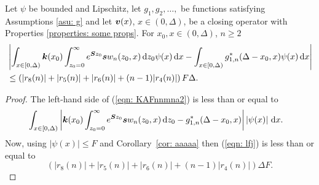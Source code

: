 \begin{cor}
	Let \(\psi\) be bounded and Lipschitz, let \(g_1,g_2,\dots,\) be functions satisfying Assumptions \ref{asu: g} and let \({\boldsymbol v}(x)\), \(x\in(0,\Delta)\), be a closing operator with Properties \ref{properties: some props}. For \(x_0,x\in(0,\Delta)\), \(n\geq 2\)
	\begin{align}
		&\left| \int_{x\in[0,\Delta)}\boldsymbol k(x_0) \int_{z_0=0}^\infty e^{\boldsymbol Sz_0}\boldsymbol sw_n(z_0,x)\, \mathrm{d} z_0 \psi(x)\, \mathrm{d} x  
		- \int_{x\in[0,\Delta)} g_{1,n}^*(\Delta-x_0,x)\psi(x)\, \mathrm{d} x \right|\nonumber 
		\\&\leq \left(|r_8(n)|+|r_5(n)|+|r_6(n)| + (n-1)|r_4(n)|\right)F\Delta.\label{eqn: KAFnnmna2}
	\end{align}
\end{cor}
\begin{proof}
	The left-hand side of (\ref{eqn: KAFnnmna2}) is less than or equal to 
	\begin{align}
		& \int_{x\in[0,\Delta)} \left| \boldsymbol k(x_0) \int_{z_0=0}^\infty e^{\boldsymbol Sz_0}\boldsymbol sw_n(z_0,x)\, \mathrm{d} z_0 
		- g_{1,n}^*(\Delta-x_0,x)\right| \left|\psi(x)\right|\, \mathrm{d} x . \label{eqn: lfj}
	\end{align}
	Now, using \(|\psi(x)|\leq F\) and Corollary~\ref{cor: aaaaa} then (\ref{eqn: lfj}) is less than or equal to 
		\[\left(|r_8(n)|+|r_5(n)|+|r_6(n)| + (n-1)|r_4(n)|\right) \Delta F.\]
\end{proof}
%
%
